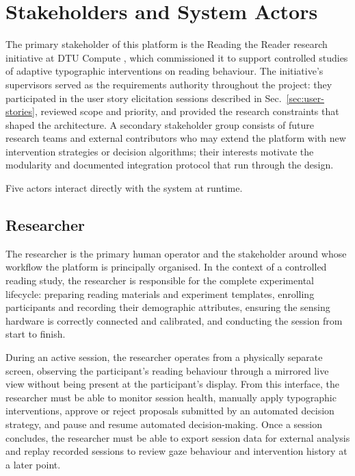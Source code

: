 \section{Stakeholders and System Actors}
\label{sec:stakeholders}

The primary stakeholder of this platform is the Reading the Reader research initiative at DTU Compute \cite{dtucompute2025rtr}, which commissioned it to support controlled studies of adaptive typographic interventions on reading behaviour.
The initiative's supervisors served as the requirements authority throughout the project: they participated in the user story elicitation sessions described in Sec.~\ref{sec:user-stories}, reviewed scope and priority, and provided the research constraints that shaped the architecture.
A secondary stakeholder group consists of future research teams and external contributors who may extend the platform with new intervention strategies or decision algorithms; their interests motivate the modularity and documented integration protocol that run through the design.

Five actors interact directly with the system at runtime.

\subsection{Researcher}
\label{sec:stakeholder-researcher}

The researcher is the primary human operator and the stakeholder around whose workflow the platform is principally organised.
In the context of a controlled reading study, the researcher is responsible for the complete experimental lifecycle: preparing reading materials and experiment templates, enrolling participants and recording their demographic attributes, ensuring the sensing hardware is correctly connected and calibrated, and conducting the session from start to finish.

During an active session, the researcher operates from a physically separate screen, observing the participant's reading behaviour through a mirrored live view without being present at the participant's display.
From this interface, the researcher must be able to monitor session health, manually apply typographic interventions, approve or reject proposals submitted by an automated decision strategy, and pause and resume automated decision-making.
Once a session concludes, the researcher must be able to export session data for external analysis and replay recorded sessions to review gaze behaviour and intervention history at a later point.

